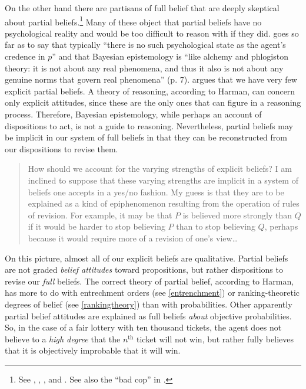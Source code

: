 On the other hand there are partisans of full belief that are deeply skeptical
about partial beliefs.\footnote{See \citet{harman1986change},
\citet{pollock2006thinking}, \citet{moon2017beliefs}, and
\citet{horgan2017troubles}. See also the ``bad cop'' in \citet{hajek2017tale}.}
Many of these object that partial beliefs have no psychological reality and
would be too difficult to reason with if they did. \citet{horgan2017troubles}
goes so far as to say that typically ``there is no such psychological state as
the agent's credence in $p$'' and that Bayesian epistemology is ``like alchemy
and phlogiston theory: it is not about any real phenomena, and thus it also is
not about any genuine norms that govern real phenomena'' (p. 7).
\citet{harman1986change} argues that we have very few explicit partial beliefs.
A theory of reasoning, according to Harman, can concern only explicit attitudes,
since these are the only ones that can figure in a reasoning process. Therefore,
Bayesian epistemology, while perhaps an account of dispositions to act, is not a
guide to reasoning. Nevertheless, partial beliefs may be implicit in our system
of full beliefs in that they can be reconstructed from our dispositions to
revise them.
\begin{quote}
How should we account for the varying strengths of explicit beliefs? I am
inclined to suppose that these varying strengths are implicit in a system of
beliefs one accepts in a yes/no fashion. My guess is that they are to be
explained as a kind of epiphenomenon resulting from the operation of rules of
revision. For example, it may be that $P$ is believed more strongly than $Q$ if
it would be harder to stop believing $P$ than to stop believing $Q$, perhaps
because it would require more of a revision of one's view\ldots \citep[p.
22]{harman1986change}
\end{quote}
On this picture, almost all of our explicit beliefs are qualitative. Partial
beliefs are not graded {\em belief attitudes} toward propositions, but rather
dispositions to revise our {\em full} beliefs. The correct theory of partial
belief, according to Harman, has more to do with entrechment orders (see
\autoref{entrenchment}) or ranking-theoretic degrees of belief (see
\autoref{rankingtheory}) than with probabilities. Other apparently partial
belief attitudes are explained as full beliefs {\em about} objective
probabilities. So, in the case of a fair lottery with ten thousand tickets, the
agent does not believe to a {\em high degree} that the $n^\text{th}$ ticket will
not win, but rather fully believes that it is objectively improbable that it
will win.

